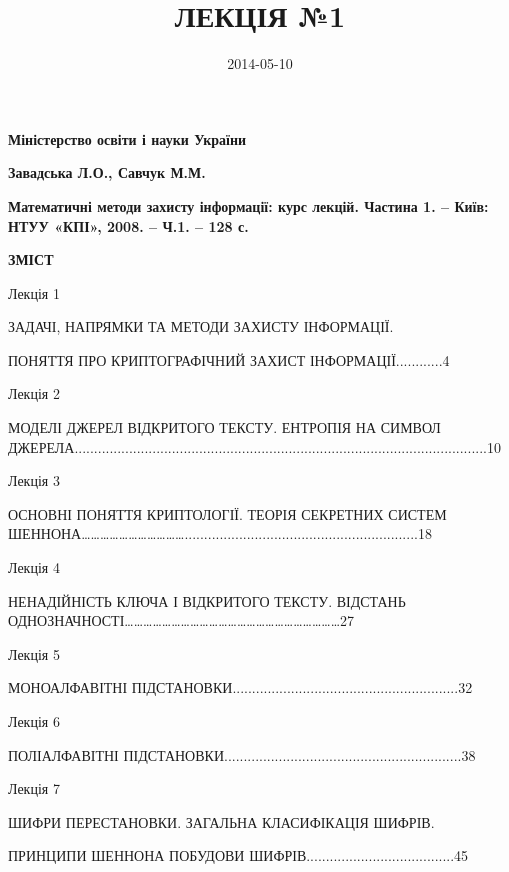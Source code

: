 \documentclass[a4paper]{article}
\title{ЛЕКЦІЯ №1}
\author{}
\date{2014-05-10}
\newcounter{}
\begin{document}
\clearpage\setcounter{page}{3}\pagestyle{Standard}
{\centering\bfseries
Міністерство освіти і науки України
\par}


\bigskip

{\centering\bfseries
Завадська Л.О., Савчук М.М.
\par}

{\bfseries
Математичні методи захисту інформації: курс лекцій. Частина 1. – Київ: НТУУ
«КПІ», 2008. – Ч.1. – 128 с.}


\bigskip


\bigskip

{\centering\bfseries
ЗМІСТ
\par}


\bigskip


\bigskip

Лекція 1

ЗАДАЧІ,  НАПРЯМКИ  ТА  МЕТОДИ  ЗАХИСТУ  ІНФОРМАЦІЇ.

ПОНЯТТЯ  ПРО  КРИПТОГРАФІЧНИЙ  ЗАХИСТ  ІНФОРМАЦІЇ............4

Лекція 2

МОДЕЛІ  ДЖЕРЕЛ  ВІДКРИТОГО  ТЕКСТУ.  ЕНТРОПІЯ  НА  СИМВОЛ
ДЖЕРЕЛА..........................................................................................................10


\bigskip

Лекція  3

ОСНОВНІ  ПОНЯТТЯ  КРИПТОЛОГІЇ. ТЕОРІЯ СЕКРЕТНИХ СИСТЕМ
ШЕННОНА……………………………............................................................18


\bigskip

Лекція 4

НЕНАДІЙНІСТЬ  КЛЮЧА  І  ВІДКРИТОГО  ТЕКСТУ.  ВІДСТАНЬ
ОДНОЗНАЧНОСТІ……………………………………………………………27


\bigskip

Лекція 5

МОНОАЛФАВІТНІ 
ПІДСТАНОВКИ..........................................................32


\bigskip

Лекція  6

ПОЛІАЛФАВІТНІ 
ПІДСТАНОВКИ.............................................................38


\bigskip

Лекція 7

ШИФРИ  ПЕРЕСТАНОВКИ. ЗАГАЛЬНА  КЛАСИФІКАЦІЯ  ШИФРІВ.

ПРИНЦИПИ  ШЕННОНА  ПОБУДОВИ  ШИФРІВ......................................45
\end{document}
